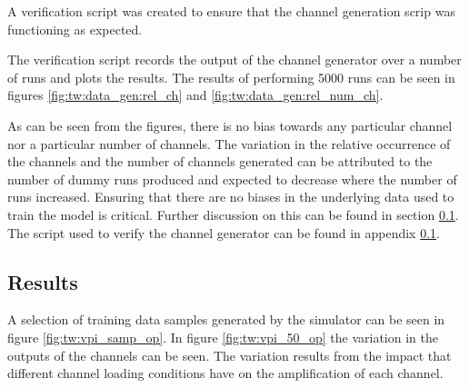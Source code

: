 A verification script was created to ensure that the channel generation scrip was functioning as expected.

The verification script records the output of the channel generator over a number of runs and plots the results. The results of performing 5000 runs can be seen in figures \ref{fig:tw:data_gen:rel_ch} and \ref{fig:tw:data_gen:rel_num_ch}. 

As can be seen from the figures, there is no bias towards any particular channel nor a particular number of channels. The variation in the relative occurrence of the channels and the number of channels generated can be attributed to the number of dummy runs produced and expected to decrease where the number of runs increased. Ensuring that there are no biases in the underlying data used to train the model is critical. Further discussion on this can be found in section \ref{}. The script used to verify the channel generator can be found in appendix \ref{}.

\FloatBarrier

\subsection{Results}

A selection of training data samples generated by the simulator can be seen in figure \ref{fig:tw:vpi_samp_op}. In figure \ref{fig:tw:vpi_50_op} the variation in the outputs of the channels can be seen. The variation results from the impact that different channel loading conditions have on the amplification of each channel.

